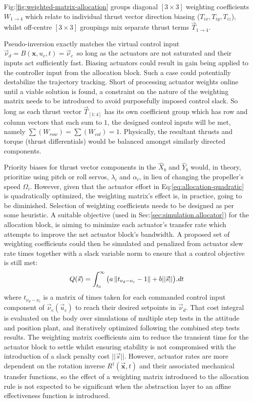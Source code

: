 \par
Fig:\ref{fig:weighted-matrix-allocation} groups diagonal $[3\times 3]$ weighting coefficients $W_{1\rightarrow 4}$ which relate to individual thrust vector direction biasing ($T_{ix},T_{iy},T_{iz}$), whilst off-centre $[3\times 3]$ groupings mix separate thrust terms $\vec{T}_{1\rightarrow 4}$. 
\par
Pseudo-inversion exactly matches the virtual control input $\vec{\nu}_d=B(\mathbf{x},u_c,t)=\vec{\nu}_c$~so long as the actuators are not saturated and their inputs act sufficiently fast. Biasing actuators could result in gain being applied to the controller input from the allocation block. Such a case could potentially destabilize the trajectory tracking. Short of processing actuator weights online until a viable solution is found, a constraint on the nature of the weighting matrix needs to be introduced to avoid purposefully imposed control slack. So long as each thrust vector $\vec{T}_{[1:4]}$ has its own coefficient group which has row and column vectors that each sum to $1$, the designed control inputs will be met, namely $\sum (W_{row})=\sum (W_{col}) = 1$. Physically, the resultant thrusts and torque (thrust differentials) would be balanced amongst similarly directed components. 
\par
Priority biases for thrust vector components in the $\hat{X}_{b}$ and $\hat{Y}_{b}$ would, in theory, prioritize using pitch or roll servos, $\lambda_i$ and $\alpha_i$, in lieu of changing the propeller's speed $\Omega_i$. However, given that the actuator effort in Eq:\ref{eq:allocation-quadratic} is quadratically optimized, the weighting matrix's effect is, in practice, going to be diminished. Selection of weighting coefficients needs to be designed as per some heuristic. A suitable objective (used in Sec:\ref{sec:simulation.allocator}) for the allocation block, is aiming to minimize each actuator's transfer rate which attempts to improve the net actuator block's bandwidth. A proposed set of weighting coefficients could then be simulated and penalized from actuator slew rate times together with a slack variable norm to ensure that a control objective is still met:
\begin{equation}\label{eq:actuator-penalty}
Q(\vec{s})=\int_{t_0}^{\infty} \big(a\left\lVert t_{\nu_d-\nu_c}-1\right\rVert+b||\vec{s}||\big).dt
\end{equation}
where $t_{\nu_d-\nu_c}$ is a matrix of times taken for each commanded control input component of $\vec{\nu}_c(\vec{u}_c)$ to reach their desired setpoints in $\vec{\nu}_d$. That cost integral is evaluated on the body over simulations of multiple step tests in the attitude and position plant, and iteratively optimized following the combined step tests results. The weighting matrix coefficients aim to reduce the transient time for the actuator block to settle whilst ensuring stability is not compromised with the introduction of a slack penalty cost $||\vec{s}||$. However, actuator rates are more dependent on the rotation inverse $R^\dagger(\vec{\mathbf{x}},t)$ and their associated mechanical transfer functions, so the effect of a weighting matrix introduced to the allocation rule is not expected to be significant when the abstraction layer to an affine effectiveness function is introduced.